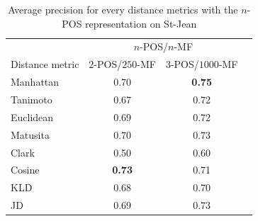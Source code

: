 \begin{table}
  \centering
  \caption{Average precision for every distance metrics with the $n$-POS representation on St-Jean}
  \label{tab:n_pos}
  \begin{tabular}{l c c c}
    \toprule
                    & \multicolumn{2}{c}{$n$-POS/$n$-MF} \\
    Distance metric & $2$-POS/$250$-MF & $3$-POS/$1000$-MF \\
    \midrule
    Manhattan & 0.70 & \textbf{0.75} \\
    Tanimoto & 0.67 & 0.72 \\
    Euclidean & 0.69 & 0.72 \\
    Matusita & 0.70 & 0.73 \\
    Clark & 0.50 & 0.60 \\
    Cosine & \textbf{0.73} & 0.71 \\
    KLD & 0.68 & 0.70 \\
    JD & 0.69 & 0.73 \\
    \bottomrule
  \end{tabular}
\end{table}
